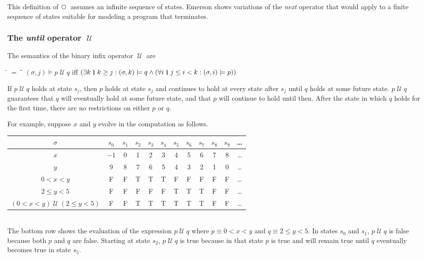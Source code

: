 \documentclass[12pt, fleqn, leqno]{article}
\newcommand{\lllgap}{12pt}                          %
\newcommand{\mymathindent}{24pt}                    %
\newcommand{\Until}{\;\mathcal{U}\;}
\newcommand{\Next}{\;\,\text{\raisebox{3.5pt}{\circle{6}}}}
\newcommand{\myqedtab}{\hspace{384pt}}              %
\newcommand{\thedr}{\rule[-.25ex]{.32mm}{1.75ex}}   %
\newcommand{\dr}{\;\,\thedr\,\;}                    %
\newcommand{\rb}{:}                                 %
\newcommand{\all}{\forall}                          %
\newcommand{\ext}{\exists}                          %
\begin{document}
This definition of $\Next$ assumes an infinite sequence of states.
Emerson \cite{Emer} shows variations of the \textit{next} operator that would apply to a finite sequence of states suitable for modeling a program that terminates. 

\subsubsection*{The \textit{until} operator $\Until$}

The semantics of the binary infix operator $\Until$ are
\begin{tabbing}
\hspace{\mymathindent} \= $= \;$ \= \myqedtab \= \kill
  \> $(\sigma, j) \models p \Until q$ \quad iff \quad $(\ext k \dr k \ge j \rb (\sigma,k) \models q \land
      (\all i \dr j\le i < k \rb (\sigma,i) \models p))$
\end{tabbing}
If $p \Until q$ holds at state $s_j$, then $p$ holds at state $s_j$ and continues to hold at every state
after $s_j$ until $q$ holds at some future state.
$p \Until q$ guarantees that $q$ will eventually hold at some future state, and that $p$ will continue to hold until then.
After the state in which $q$ holds for the first time, there are no restrictions on either $p$ or $q$.

For example, suppose $x$ and $y$ evolve in the computation as follows.\\[\lllgap]
\begin{tabular}{c|ccccccccccc}
  $\sigma$                  & $s_0$ & $s_1$ & $s_2$ & $s_3$ & $s_4$ & $s_5$ & $s_6$ & $s_7$ & $s_8$ & $s_9$ & \dots \\
  \hline
  $x$                       & $-1$  & 0     & 1     & 2     & 3     & 4     & 5     &  6    &  7    &  8    &  \dots\\
  $y$                       & 9     & 8     & 7     & 6     & 5     & 4     & 3     &  2    &  1    &  0    &  \dots\\
  $0<x<y$                   & F     & F     & T     & T     & T     & F     & F     &  F    &  F    &  F    &  \dots\\
  $2\le y<5$                & F     & F     & F     & F     & F     & T     & T     &  T    &  F    &  F    &  \dots\\
  $(0<x<y)\Until(2\le y<5)$ & F     & F     & T     & T     & T     & T     & T     &  T    &  F    &  F    &  \dots
\end{tabular}\\[\lllgap]
The bottom row shows the evaluation of the expression $p\Until q$ where $p\equiv 0<x<y$ and $q\equiv 2\le y<5$.
In states $s_0$ and $s_1$, $p\Until q$ is false because both $p$ and $q$ are false.
Starting at state $s_2$, $p\Until q$ is true because in that state $p$ is true and will remain true until $q$
eventually becomes true in state $s_5$.
\end{document}

